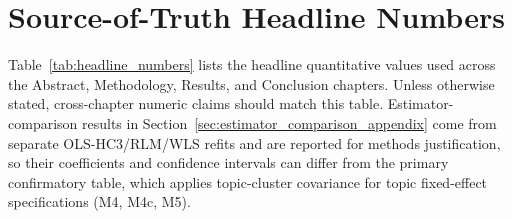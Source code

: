 \pagebreak
\section{Source-of-Truth Headline Numbers}
\label{sec:source_of_truth_numbers}

Table~\ref{tab:headline_numbers} lists the headline quantitative values used across
the Abstract, Methodology, Results, and Conclusion chapters. Unless otherwise
stated, cross-chapter numeric claims should match this table. Estimator-comparison
results in Section~\ref{sec:estimator_comparison_appendix} come from separate
OLS-HC3/RLM/WLS refits and are reported for methods justification, so their
coefficients and confidence intervals can differ from the primary confirmatory
table, which applies topic-cluster covariance for topic fixed-effect
specifications (M4, M4c, M5).

